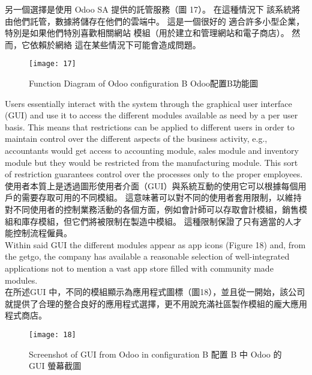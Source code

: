 \fontsize{12}{2.5pt}\sectionef  
{另一個選擇是使用 Odoo SA 提供的託管服務（圖 17）。 在這種情況下
該系統將由他們託管，數據將儲存在他們的雲端中。 這是一個很好的
適合許多小型企業，特別是如果他們特別喜歡相關網站
模組（用於建立和管理網站和電子商店）。 然而，它依賴於網絡
這在某些情況下可能會造成問題。}
\\[15pt]


\begin{figure}[hbt!]
\begin{center}
\texttt{[image: 17]}
\caption{\Large  Function Diagram of Odoo configuration B Odoo配置B功能圖}\label{fig.17}
\end{center}
\end{figure}

\fontsize{12}{2.5pt}\sectionef 
 {Users essentially interact with the system through the graphical user interface (GUI) and
use it to access the different modules available as need by a per user basis. This means that
restrictions can be applied to different users in order to maintain control over the different
aspects of the business activity, e.g., accountants would get access to accounting module,
sales module and inventory module but they would be restricted from the manufacturing
module. This sort of restriction guarantees control over the processes only to the proper
employees.}\\[1pt]

\fontsize{12}{2.5pt}\sectionef  
{使用者本質上是透過圖形使用者介面（GUI）與系統互動的使用它可以根據每個用戶的需要存取可用的不同模組。 這意味著可以對不同的使用者套用限制，以維持對不同使用者的控制業務活動的各個方面，例如會計師可以存取會計模組，銷售模組和庫存模組，但它們將被限制在製造中模組。 這種限制保證了只有適當的人才能控制流程僱員。}
\\[15pt]


\fontsize{12}{2.5pt}\sectionef 
 {Within said GUI the different modules appear as app icons (Figure 18) and, from the getgo, the company has available a reasonable selection of well-integrated applications not to mention a vast app store filled with community made modules.}\\[1pt]

\fontsize{12}{2.5pt}\sectionef  
{在所述GUI 中，不同的模組顯示為應用程式圖標（圖18），並且從一開始，該公司就提供了合理的整合良好的應用程式選擇，更不用說充滿社區製作模組的龐大應用程式商店。}
\\[15pt]


\begin{figure}[hbt!]
\begin{center}
\texttt{[image: 18]}
\caption{\Large Screenshot of GUI from Odoo in configuration B 配置 B 中 Odoo 的 GUI 螢幕截圖}\label{fig.18}
\end{center}
\end{figure}

